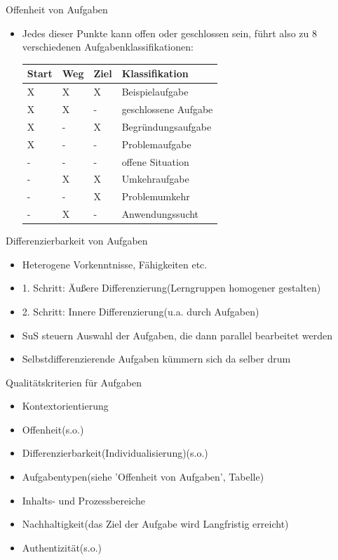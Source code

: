 \documentclass{article}
\begin{document}
\begin{block}{Offenheit von Aufgaben}
\begin{itemize}
\begin{itemize}
        \end{itemize}
        \item Jedes dieser Punkte kann offen oder geschlossen sein, führt also zu 8 verschiedenen Aufgabenklassifikationen:
        \begin{tabular}{|P{1.5cm}|P{1.5cm}|P{1.5cm}|p{4cm}|}
            \hline
            \textbf{Start} & \textbf{Weg} & \textbf{Ziel} & \textbf{Klassifikation} \\
            \hline
            X & X & X & Beispielaufgabe \\
            \hline
            X & X & - & geschlossene Aufgabe \\
            \hline
            X & - & X & Begründungsaufgabe \\
            \hline
            X & - & - & Problemaufgabe \\
            \hline
            - & - & - & offene Situation \\
            \hline
            - & X & X & Umkehraufgabe \\
            \hline
            - & - & X & Problemumkehr \\
            \hline
            - & X & - & Anwendungssucht \\
            \hline
        \end{tabular}
    \end{itemize}
\end{block}

\begin{block}{Differenzierbarkeit von Aufgaben}
    \begin{itemize}
        \item Heterogene Vorkenntnisse, Fähigkeiten etc.
        \item 1. Schritt: Äußere Differenzierung(Lerngruppen homogener gestalten)
        \item 2. Schritt: Innere Differenzierung(u.a. durch Aufgaben)
        \item SuS steuern Auswahl der Aufgaben, die dann parallel bearbeitet werden
        \item Selbstdifferenzierende Aufgaben kümmern sich da selber drum
    \end{itemize}
\end{block}

\begin{block}{Qualitätskriterien für Aufgaben}
    \begin{itemize}
        \item Kontextorientierung
        \item Offenheit(s.o.)
        \item Differenzierbarkeit(Individualisierung)(s.o.)
        \item Aufgabentypen(siehe 'Offenheit von Aufgaben', Tabelle)
        \item Inhalts- und Prozessbereiche
        \item Nachhaltigkeit(das Ziel der Aufgabe wird Langfristig erreicht)
        \item Authentizität(s.o.)
    \end{itemize}
\end{block}
\end{document}
